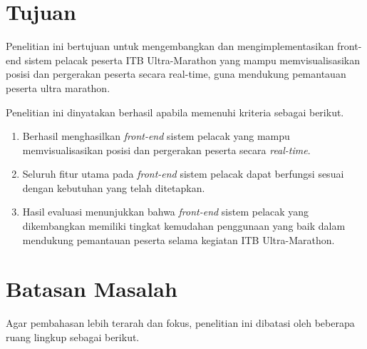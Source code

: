 \section{Tujuan}
Penelitian ini bertujuan untuk mengembangkan dan mengimplementasikan front-end sistem pelacak peserta ITB Ultra-Marathon yang mampu memvisualisasikan posisi dan pergerakan peserta secara real-time, guna mendukung pemantauan peserta ultra marathon.

Penelitian ini dinyatakan berhasil apabila memenuhi kriteria sebagai berikut.
\begin{enumerate}
    \item Berhasil menghasilkan \textit{front-end} sistem pelacak yang mampu memvisualisasikan posisi dan pergerakan peserta secara \textit{real-time}.
    \item Seluruh fitur utama pada \textit{front-end} sistem pelacak dapat berfungsi sesuai dengan kebutuhan yang telah ditetapkan.
    \item Hasil evaluasi menunjukkan bahwa \textit{front-end} sistem pelacak yang dikembangkan memiliki tingkat kemudahan penggunaan yang baik dalam mendukung pemantauan peserta selama kegiatan ITB Ultra-Marathon.
\end{enumerate}
\section{Batasan Masalah}
Agar pembahasan lebih terarah dan fokus, penelitian ini dibatasi oleh beberapa ruang lingkup sebagai berikut.

